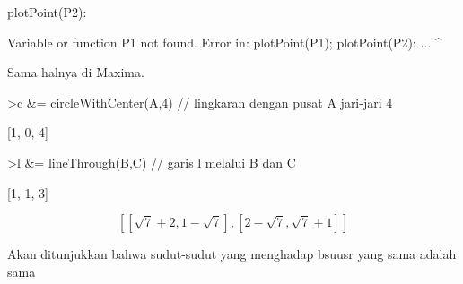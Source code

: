 \documentclass[a4paper,10pt]{article}
\begin{document}
\begin{eulernotebook}
\begin{eulercomment}
\begin{eulercomment}
\begin{eulercomment}
\begin{eulercomment}
\begin{eulercomment}
\begin{eulercomment}
\begin{eulercomment}
\begin{eulercomment}
\begin{eulercomment}
\begin{eulercomment}
\begin{eulercomment}
\begin{eulercomment}
\begin{eulercomment}
\begin{eulercomment}
\begin{eulercomment}
\begin{eulercomment}
\begin{eulercomment}
\begin{eulercomment}
\begin{eulercomment}
\begin{eulercomment}
\begin{eulercomment}
\begin{eulercomment}
\begin{eulercomment}
\begin{eulercomment}
\begin{eulercomment}
\begin{eulercomment}
\begin{eulercomment}
\begin{eulercomment}
\begin{eulercomment}
\begin{eulercomment}
\begin{eulercomment}
\begin{eulercomment}
\begin{eulercomment}
\begin{eulercomment}
\begin{eulercomment}
\begin{eulercomment}
\begin{eulercomment}
\begin{eulercomment}
\begin{eulercomment}
\begin{eulercomment}
\begin{eulercomment}
\begin{eulercomment}
\begin{eulercomment}
\begin{eulercomment}
\begin{eulercomment}
\begin{eulercomment}
\begin{eulercomment}
\begin{eulercomment}
\begin{eulercomment}
\begin{eulercomment}
\begin{eulercomment}
\begin{eulercomment}
\begin{eulercomment}
\begin{eulercomment}
\begin{eulercomment}
\begin{eulercomment}
\begin{eulercomment}
\begin{eulercomment}
\begin{eulercomment}
\begin{eulercomment}
\begin{eulercomment}
\begin{eulercomment}
\begin{eulerprompt}
plotPoint(P2):
\end{eulerprompt}
\begin{euleroutput}
  Variable or function P1 not found.
  Error in:
  plotPoint(P1); plotPoint(P2): ...
              ^
\end{euleroutput}
\begin{eulercomment}
Sama halnya di Maxima.
\end{eulercomment}
\begin{eulerprompt}
>c &= circleWithCenter(A,4) // lingkaran dengan pusat A jari-jari 4
\end{eulerprompt}
\begin{euleroutput}
  
                                [1, 0, 4]
  
\end{euleroutput}
\begin{eulerprompt}
>l &= lineThrough(B,C) // garis l melalui B dan C
\end{eulerprompt}
\begin{euleroutput}
  
                                [1, 1, 3]
  
\end{euleroutput}
\begin{eulerformula}
\[
\left[ \left[ \sqrt{7}+2 , 1-\sqrt{7} \right]  , \left[ 2-\sqrt{7}
  , \sqrt{7}+1 \right]  \right] 
\]
\end{eulerformula}
\begin{eulercomment}
Akan ditunjukkan bahwa sudut-sudut yang menghadap bsuusr yang sama
adalah sama 
\end{eulercomment}
\end{eulercomment}
\end{eulercomment}
\end{eulercomment}
\end{eulercomment}
\end{eulercomment}
\end{eulercomment}
\end{eulercomment}
\end{eulercomment}
\end{eulercomment}
\end{eulercomment}
\end{eulercomment}
\end{eulercomment}
\end{eulercomment}
\end{eulercomment}
\end{eulercomment}
\end{eulercomment}
\end{eulercomment}
\end{eulercomment}
\end{eulercomment}
\end{eulercomment}
\end{eulercomment}
\end{eulercomment}
\end{eulercomment}
\end{eulercomment}
\end{eulercomment}
\end{eulercomment}
\end{eulercomment}
\end{eulercomment}
\end{eulercomment}
\end{eulercomment}
\end{eulercomment}
\end{eulercomment}
\end{eulercomment}
\end{eulercomment}
\end{eulercomment}
\end{eulercomment}
\end{eulercomment}
\end{eulercomment}
\end{eulercomment}
\end{eulercomment}
\end{eulercomment}
\end{eulercomment}
\end{eulercomment}
\end{eulercomment}
\end{eulercomment}
\end{eulercomment}
\end{eulercomment}
\end{eulercomment}
\end{eulercomment}
\end{eulercomment}
\end{eulercomment}
\end{eulercomment}
\end{eulercomment}
\end{eulercomment}
\end{eulercomment}
\end{eulercomment}
\end{eulercomment}
\end{eulercomment}
\end{eulercomment}
\end{eulercomment}
\end{eulercomment}
\end{eulercomment}
\end{eulernotebook}
\end{document}
